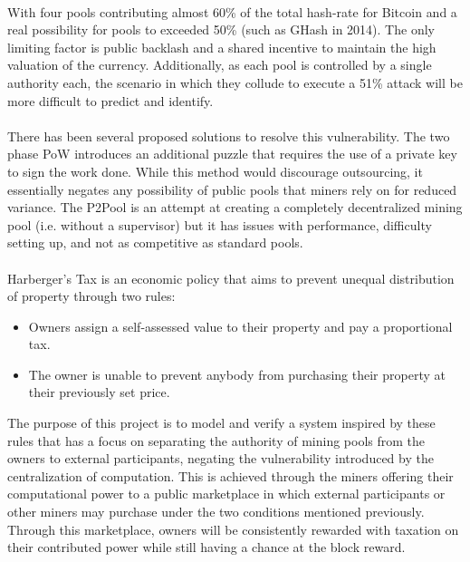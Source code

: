 \paragraph{} With four pools contributing almost 60\% of the total hash-rate for Bitcoin \cite{bitcoinpools2020} and a real possibility for pools to exceeded 50\% (such as GHash in 2014). The only limiting factor is public backlash and a shared incentive to maintain the high valuation of the currency. Additionally, as each pool is controlled by a single authority each, the scenario in which they collude to execute a 51\% attack will be more difficult to predict and identify.

\paragraph{} There has been several proposed solutions to resolve this vulnerability. The two phase PoW \cite{bastiaan2015} introduces an additional puzzle that requires the use of a private key to sign the work done. While this method would discourage outsourcing, it essentially negates any possibility of public pools that miners rely on for reduced variance. The P2Pool is an attempt at creating a completely decentralized mining pool (i.e. without a supervisor) but it has issues with performance, difficulty setting up, and not as competitive as standard pools.

\paragraph{} Harberger's Tax  is an economic policy that aims to prevent unequal distribution of property through two rules:

\begin{itemize}
  \item Owners assign a self-assessed value to their property and pay a proportional tax.
  \item The owner is unable to prevent anybody from purchasing their property at their previously set price.
\end{itemize}

The purpose of this project is to model and verify a system inspired by these rules that has a focus on separating the authority of mining pools from the owners to external participants, negating the vulnerability introduced by the centralization of computation. This is achieved through the miners offering their computational power to a public marketplace in which external participants or other miners may purchase under the two conditions mentioned previously. Through this marketplace, owners will be consistently rewarded with taxation on their contributed power while still having a chance at the block reward.

